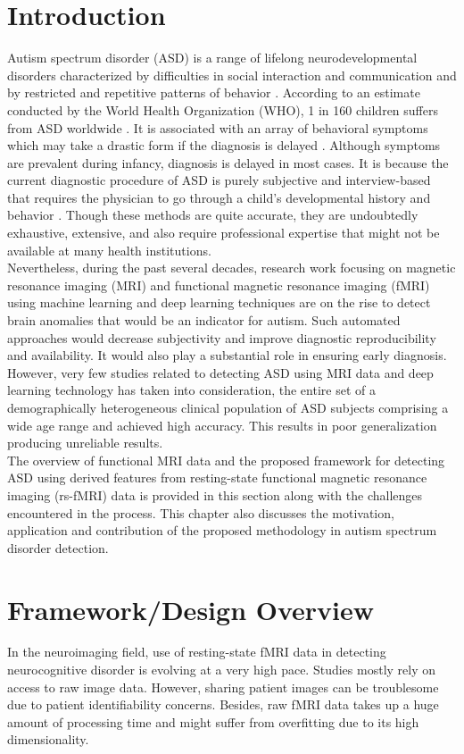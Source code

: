 \section{Introduction}
\label{intro}
Autism spectrum disorder (\gls{ASD}) is a range of lifelong neurodevelopmental disorders characterized by difficulties in social interaction and communication and by restricted and repetitive patterns of behavior \cite{r1}. According to an estimate conducted by the World Health Organization (\gls{WHO}), 1 in 160 children suffers from ASD worldwide \cite{r2}. It is associated with an array of behavioral symptoms which may take a drastic form if the diagnosis is delayed \cite{r3,r4}. Although symptoms are prevalent during infancy, diagnosis is delayed in most cases. It is because the current diagnostic procedure of ASD is purely subjective and interview-based that requires the physician to go through a child’s developmental history and behavior \cite{r5,r6}. Though these methods are quite accurate, they are undoubtedly exhaustive, extensive, and also require professional expertise that might not be available at many health institutions.\\

Nevertheless, during the past several decades, research work focusing on magnetic resonance imaging (\gls{MRI}) and functional magnetic resonance imaging (\gls{fMRI}) using machine learning and deep learning techniques are on the rise to detect brain anomalies that would be an indicator for autism. Such automated approaches would decrease subjectivity and improve diagnostic reproducibility and availability. It would also play a substantial role in ensuring early diagnosis. However, very few studies related to detecting ASD using MRI data and deep learning technology has taken into consideration, the entire set of a demographically heterogeneous clinical population of ASD subjects comprising a wide age range and achieved high accuracy. This results in poor generalization producing unreliable results.\\

The overview of functional MRI data and the proposed framework for detecting ASD using
derived features from resting-state functional magnetic resonance imaging (\gls{rs-fMRI}) data
is provided in this section along with the challenges encountered in the process. This chapter
also discusses the motivation, application and contribution of the proposed methodology in
autism spectrum disorder detection.

\section{Framework/Design Overview}
In the neuroimaging field, use of resting-state fMRI data in detecting neurocognitive disorder
is evolving at a very high pace. Studies mostly rely on access to raw image data. However,
sharing patient images can be troublesome due to patient identifiability concerns. Besides,
raw fMRI data takes up a huge amount of processing time and might suffer from overfitting
due to its high dimensionality.\\

